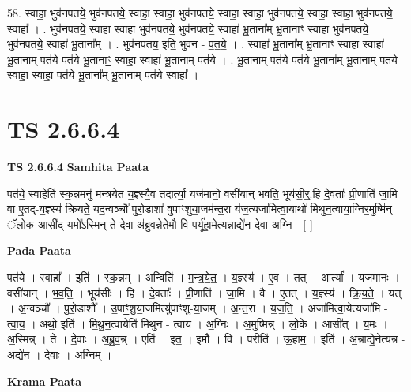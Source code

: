 \documentclass[17pt]{extarticle}
\begin{document}
58. स्वाहा॒ भुव॑नपतये॒ भुव॑नपतये॒ स्वाहा॒ स्वाहा॒ भुव॑नपतये॒ स्वाहा॒ स्वाहा॒ भुव॑नपतये॒ स्वाहा॒ स्वाहा॒ भुव॑नपतये॒ स्वाहा᳚ । . भुव॑नपतये॒ स्वाहा॒ स्वाहा॒ भुव॑नपतये॒ भुव॑नपतये॒ स्वाहा॑ भू॒ताना᳚म् भू॒तानाꣳ॒॒ स्वाहा॒ भुव॑नपतये॒ भुव॑नपतये॒ स्वाहा॑ भू॒ताना᳚म् । . भुव॑नपतय॒ इति॒ भुव॑न - प॒त॒ये॒ । . स्वाहा॑ भू॒ताना᳚म् भू॒तानाꣳ॒॒ स्वाहा॒ स्वाहा॑ भू॒ताना॒म् पत॑ये॒ पत॑ये भू॒तानाꣳ॒॒ स्वाहा॒ स्वाहा॑ भू॒ताना॒म् पत॑ये । . भू॒ताना॒म् पत॑ये॒ पत॑ये भू॒ताना᳚म् भू॒ताना॒म् पत॑ये॒ स्वाहा॒ स्वाहा॒ पत॑ये भू॒ताना᳚म् भू॒ताना॒म् पत॑ये॒ स्वाहा᳚ । \newline
\pagebreak
{}
\section*{ TS 2.6.6.4 }

\textbf{TS 2.6.6.4 } \newline
\textbf{Samhita Paata} \newline

पत॑ये॒ स्वाहेति॑ स्क॒न्नमनु॑ मन्त्रयेत य॒ज्ञ्स्यै॒व तदार्त्या॒ यज॑मानो॒ वसी॑यान् भवति॒ भूय॑सी॒र्॒.हि दे॒वताः᳚ प्री॒णाति॑ जा॒मि वा ए॒तद्-य॒ज्ञ्स्य॑ क्रियते॒ यद॒न्वञ्चौ॑ पुरो॒डाशा॑ वुपाꣳशुया॒जम॑न्त॒रा य॑ज॒त्यजा॑मित्वा॒याथो॑ मिथुन॒त्वाया॒ग्निर॒मुष्मि॑न् ॅलो॒क आसी᳚द्-य॒मो᳚ऽस्मिन् ते दे॒वा अ॑ब्रुव॒न्नेते॒मौ वि पर्यू॑हा॒मेत्य॒न्नाद्ये॑न दे॒वा अ॒ग्नि - [  ] \newline

\textbf{Pada Paata} \newline

पत॑ये । स्वाहा᳚ । इति॑ । स्क॒न्नम् । अन्विति॑ ।   म॒न्त्र॒ये॒त॒ । य॒ज्ञ्स्य॑ । ए॒व । तत् । आर्त्या᳚ । यज॑मानः । वसी॑यान् । भ॒व॒ति॒ । भूय॑सीः । हि । दे॒वताः᳚ । प्री॒णाति॑ । जा॒मि । वै । ए॒तत् । य॒ज्ञ्स्य॑ । क्रि॒य॒ते॒ । यत् । अ॒न्वञ्चौ᳚ । पु॒रो॒डाशौ᳚ । उ॒पाꣳ॒॒शु॒या॒जमित्यु॑पाꣳशु-या॒जम् । अ॒न्त॒रा । य॒ज॒ति॒ । अजा॑मित्वा॒येत्यजा॑मि - त्वा॒य॒ । अथो॒ इति॑ । मि॒थु॒न॒त्वायेति॑ मिथुन - त्वाय॑ । अ॒ग्निः । अ॒मुष्मिन्न्॑ । लो॒के । आसी᳚त् । य॒मः । अ॒स्मिन्न् । ते । दे॒वाः । अ॒ब्रु॒व॒न्न् । एति॑ । इ॒त॒ । इ॒मौ । वि । परीति॑ । ऊ॒हा॒म॒ । इति॑ । अ॒न्नाद्ये॒नेत्य॑न्न - अद्ये॑न ।   दे॒वाः । अ॒ग्निम् ।  \newline


\textbf{Krama Paata} \newline
\end{document}
